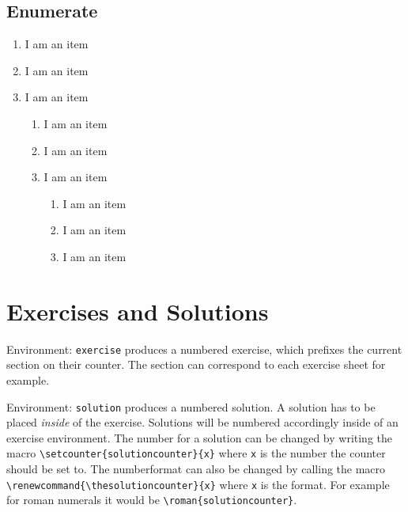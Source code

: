 \documentclass[10pt]{article}
\begin{document}
\subsection{Enumerate}
\begin{enumerate}
  \item I am an item
  \item I am an item
  \item I am an item
        \begin{enumerate}
          \item I am an item
          \item I am an item
          \item I am an item
                \begin{enumerate}
                  \item I am an item
                  \item I am an item
                  \item I am an item
                \end{enumerate}
        \end{enumerate}
\end{enumerate}

\newpage
\section{Exercises and Solutions}
Environment: \lstinline{exercise} produces a numbered exercise, which prefixes the current section on their counter. The section can correspond to each exercise sheet for example.

\noindent Environment: \lstinline{solution} produces a numbered solution. A solution has to be placed \emph{inside} of the exercise. Solutions will be numbered accordingly inside of an exercise environment. The number for a solution can be changed by writing the macro \lstinline|\setcounter{solutioncounter}{x}| where \lstinline{x} is the number the counter should be set to.
The numberformat can also be changed by calling the macro \lstinline|\renewcommand{\thesolutioncounter}{x}| where \lstinline{x} is the format. For example for roman numerals it would be \lstinline|\roman{solutioncounter}|.

\begin{exercise}
  \lipsum[1-1]
  \begin{solution}
    \lipsum[1-1]
  \end{solution}
  \begin{solution}
    \lipsum[1-1]
  \end{solution}
  \begin{solution}
    \lipsum[1-1]
  \end{solution}
\end{exercise}
\end{document}
